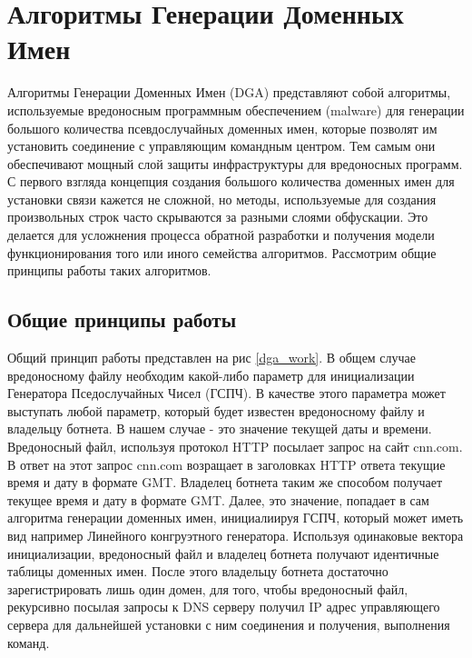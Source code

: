 \section{Алгоритмы Генерации Доменных Имен}
Алгоритмы Генерации Доменных Имен (DGA) представляют собой алгоритмы, используемые вредоносным программным обеспечением (malware) для генерации большого количества псевдослучайных доменных имен, которые позволят им установить соединение с управляющим командным центром. Тем самым они обеспечивают мощный слой защиты инфраструктуры для вредоносных программ. С первого взгляда концепция создания большого количества доменных имен для установки связи кажется не сложной, но методы, используемые для создания произвольных строк часто скрываются за разными слоями обфускации. Это делается для усложнения процесса обратной разработки и получения модели функционирования того или иного семейства алгоритмов. Рассмотрим общие принципы работы таких алгоритмов.
    \subsection{Общие принципы работы}\label{work_princip}
        Общий принцип работы представлен на рис \ref{dga_work}. В общем случае вредоносному файлу необходим какой-либо параметр для инициализации Генератора Пседослучайных Чисел (ГСПЧ). В качестве этого параметра может выступать любой параметр, который будет известен вредоносному файлу и владельцу ботнета. В нашем случае - это значение текущей даты и времени. Вредоносный файл, используя протокол HTTP посылает запрос на сайт cnn.com. В ответ на этот запрос cnn.com возращает в заголовках HTTP ответа текущие время и дату в формате GMT. Владелец ботнета таким же способом получает текущее время и дату в формате GMT. Далее, это значение, попадает в сам алгоритма генерации доменных имен, инициалиируя ГСПЧ, который может иметь вид например Линейного конгруэтного генератора. Используя одинаковые вектора инициализации, вредоносный файл и владелец ботнета получают идентичные таблицы доменных имен.
        После этого владельцу ботнета достаточно зарегистрировать лишь один домен, для того, чтобы вредоносный файл, рекурсивно посылая запросы к DNS серверу получил IP адрес управляющего сервера для дальнейшей установки с ним соединения и получения, выполнения команд.

